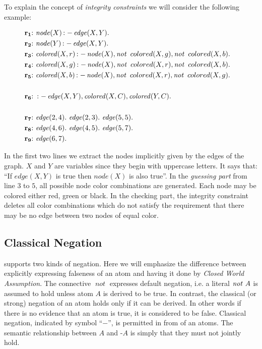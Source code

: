 \documentclass[a4paper, titlepage]{article}
\DeclareMathOperator{\leftimpl}{:-}
\DeclareMathOperator{\clasneg}{-}
\DeclareMathOperator{\nott}{\mathit{not}}
\newcommand{\rowprefix}[1]{%
  \ensuremath{\color{black}\mathbf{#1{:}}\ }%
}
\begin{document}
To explain the concept of \emph{integrity 
constraints} we will consider the following example:
\begin{exmp}
\label{nodecoloring}
\begin{align*}
\rowprefix{r_1} & \mathit{node}(X) \leftimpl \mathit{edge}(X, Y). 
&\\
\rowprefix{r_2} & \mathit{node}(Y) \leftimpl \mathit{edge}(X, Y). 
& \\
\rowprefix{r_3} & \mathit{colored}(X, r) \leftimpl \mathit{node}(X), \nott \  colored(X,g), \nott \ colored(X,b). & \\
\rowprefix{r_4} & \mathit{colored}(X, g) \leftimpl \mathit{node}(X), \nott \  colored(X,r), \nott \ colored(X,b). & \\
\rowprefix{r_5} & \mathit{colored}(X, b) \leftimpl \mathit{node}(X), \nott \  colored(X,r), \nott \ colored(X,g). & \\
\\
\rowprefix{r_6} & \leftimpl \mathit{edge}(X, Y), \mathit{colored}
(X, C), \mathit{colored}(Y, C). & \\
\\
\rowprefix{r_7} & \mathit{edge}(2, 4). \  \mathit{edge}(2, 3). \  
\mathit{edge}(5, 5). & \\
\rowprefix{r_8} & \mathit{edge}(4, 6). \  \mathit{edge}(4, 5). \ 
\mathit{edge}(5, 7). & \\
\rowprefix{r_9} & \mathit{edge}(6, 7). &
\end{align*} 
\end{exmp}
In the first two lines we extract the nodes implicitly given by the edges of the graph.
$X$ and $Y$ are 
variables since they begin with uppercase letters. It says 
that: \enquote{If $\mathit{edge}(X,Y)$ is true then 
$\mathit{node(X)}$ is also true}. In the 
\emph{guessing part} from line $3$ to $5$, all possible node color combinations 
are generated. Each node may be colored either red, 
green or black. In the checking part, the integrity constraint 
deletes all color combinations which do not satisfy the 
requirement that there may be no edge between two nodes of 
equal color.

\subsection{Classical Negation}
\dlvhex{} supports two kinds of negation. Here we will 
emphasize the difference between explicitly expressing 
falseness of an atom and having it done by \emph{Closed 
World Assumption}. The connective $\nott$ expresses 
default negation, i.e. a literal $\nott \thinspace A$ is assumed 
to hold unless atom $A$ is derived to be true. In contrast, 
the classical (or strong) negation of an atom holds only if 
it can be derived. In other words if there is no evidence 
that an atom is true, it is considered to be false. 
Classical negation, indicated by symbol ``$-$'', is 
permitted in from of an atoms. The semantic relationship 
between $A$ and $\clasneg\mathit{A}$ is simply that they must not jointly 
hold.
\end{document}
